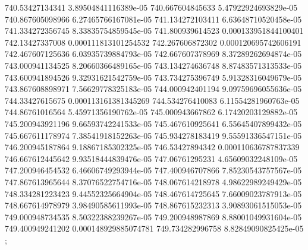 {740.53427134341 3.89504841116389e-05
740.667604845633 5.47922924693829e-05
740.867605098966 6.27465766167081e-05
741.134272103411 6.63648710520458e-05
741.334272356745 8.33835754859545e-05
741.800939614523 0.000133951844100401
742.13427337008 0.000111813101254532
742.267606872302 0.000120695742606191
742.467607125636 6.03935739884793e-05
742.667607378969 8.37289262694874e-05
743.000941134525 8.20660366489165e-05
743.134274636748 8.87483571313533e-05
743.600941894526 9.32931621542759e-05
743.734275396749 5.91328316049679e-05
743.867608898971 7.56629778325183e-05
744.000942401194 9.09759696055636e-05
744.33427615675 0.000113161381345269
744.534276410083 6.11554281960763e-05
744.86761016564 5.45971356190762e-05
745.000943667862 6.17420203129882e-05
745.200943921196 9.66593742241533e-05
745.467610925641 6.55645407899432e-05
745.667611178974 7.38541918152263e-05
745.934278183419 9.55591336547151e-05
746.200945187864 9.18867185302325e-05
746.53427894342 0.000110636787837339
746.667612445642 9.93518444839476e-05
747.06761295231 4.65609032248109e-05
747.200946454532 6.46606749293944e-05
747.400946707866 7.85230543757567e-05
747.867613965644 8.37076522754716e-05
748.067614218978 4.98622989249429e-05
748.334281223423 9.44552325664904e-05
748.467614725645 7.66009023787913e-05
748.667614978979 3.98490585611993e-05
748.867615232313 3.90893061515053e-05
749.000948734535 8.50322388239267e-05
749.200948987869 8.88001049931604e-05
749.400949241202 0.000148929885074781
749.734282996758 8.82849090825425e-05
};